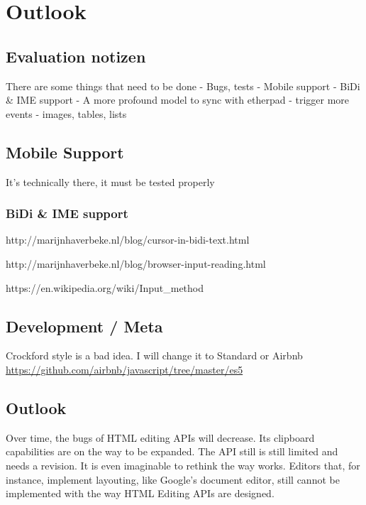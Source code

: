 \chapter{Outlook}
\label{ch:outlook}






\section{Evaluation notizen}

There are some things that need to be done
 - Bugs, tests
 - Mobile support
 - BiDi \& IME support
 - A more profound model to sync with etherpad
 - trigger more events
 - images, tables, lists




\section{Mobile Support}

It's technically there, it must be tested properly


\subsection{BiDi \& IME support}

http://marijnhaverbeke.nl/blog/cursor-in-bidi-text.html

http://marijnhaverbeke.nl/blog/browser-input-reading.html 

https://en.wikipedia.org/wiki/Input\_method


\section{Development / Meta}
Crockford style is a bad idea. 
I will change it to Standard or Airbnb 
\url{https://github.com/airbnb/javascript/tree/master/es5}


\section{Outlook}

Over time, the bugs of HTML editing APIs will decrease. Its clipboard capabilities are on the way to be expanded. The API still is still limited and needs a revision. It is even imaginable to rethink the way  works. Editors that, for instance, implement layouting, like Google's document editor, still cannot be implemented with the way HTML Editing APIs are designed.

